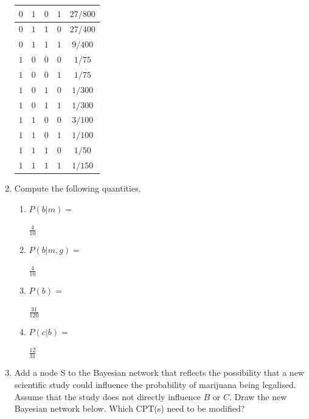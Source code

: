 \documentclass[9pt,a4paper]{extarticle}
\newenvironment{solution}
    {%
    \color{red}
    }
    { 
    \color{black}
    }
\begin{document}
\begin{enumerate}
\begin{solution}
\begin{tabular}{|c|c|c|c|c|}
        $0$ & $1$ & $0$ & $1$ & $27/800$\\ \hline
        $0$ & $1$ & $1$ & $0$ & $27/400$\\ \hline
        $0$ & $1$ & $1$ & $1$ & $9/400$\\ \hline
        $1$ & $0$ & $0$ & $0$ & $1/75$\\ \hline
        $1$ & $0$ & $0$ & $1$ & $1/75$\\ \hline
        $1$ & $0$ & $1$ & $0$ & $1/300$\\ \hline
        $1$ & $0$ & $1$ & $1$ & $1/300$\\ \hline
        $1$ & $1$ & $0$ & $0$ & $3/100$\\ \hline
        $1$ & $1$ & $0$ & $1$ & $1/100$\\ \hline
        $1$ & $1$ & $1$ & $0$ & $1/50$\\ \hline
        $1$ & $1$ & $1$ & $1$ & $1/150$\\ \hline
    \end{tabular}
    \end{solution}
    \item Compute the following quantities.
    \begin{enumerate}
        \item $P(b|m) = $
        \begin{solution}
        $\frac{4}{10}$
        \end{solution}
        \item $P(b|m, g) = $
        \begin{solution}
        $\frac{4}{10}$
        \end{solution}
        \item $P(b) = $
        \begin{solution}
        $\frac{31}{120}$
        \end{solution}
        \item $P(c|b) = $
        \begin{solution}
        $\frac{12}{31}$
        \end{solution}
    \end{enumerate}
    \item Add a node S to the Bayesian network that reflects the possibility that a new scientific study could influence the probability of marijuana being legalised. Assume that the study does not directly influence $B$ or $C$. Draw the new Bayesian network below. Which CPT(s) need to be modified?
    \begin{solution}
    \begin{figure}[h]

\end{figure}
\end{solution}
\end{enumerate}
\end{document}
